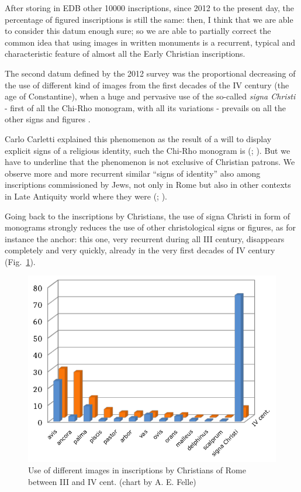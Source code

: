 \documentclass[amsthm,ebook]{saparticle}
\begin{document}
After storing in EDB other 10000 inscriptions, since 2012 to the present day, the percentage of figured inscriptions is
still the same: then, I think that we are able to consider this datum enough sure; so we are able to partially correct
the common idea that using images in written monuments is a recurrent, typical and characteristic feature of almost all
the Early Christian inscriptions.

The second datum defined by the 2012 survey was the proportional decreasing of the use of different kind of images from
the first decades of the IV century (the age of Constantine), when a huge and pervasive use of the so-called \emph{signa
Christi} - first of all the Chi-Rho monogram, with all its variations - prevails on all the other signs and figures
\citep[101-102]{felle_apporto_2013}.

Carlo Carletti explained this phenomenon as the result of a will to display explicit signs of a religious identity, such
the Chi-Rho monogram is (\citealp[68-72]{carletti_epigrafia_2008}; \citealp[365-366]{felle_judaism_2007}). But we have to underline that the phenomenon is
not exclusive of Christian patrons. We observe more and more recurrent similar ``signs of
identity'' also among inscriptions commissioned by Jews, not only in Rome but also in other contexts in
Late Antiquity world where they were (\citealp[passim]{felle_judaism_2007}; \citealp{pesce_documenti_2016}).

Going back to the inscriptions by Christians, the use of signa Christi in form of monograms strongly reduces the use
of other christological signs or figures, as for instance the anchor: this one, very recurrent during all III
century, disappears completely and very quickly, already in the very first decades of IV century \citep[103]{felle_apporto_2013}
(Fig.~\ref{fig:2}). %




\begin{figure}[!bp]
\centering
 \includegraphics[width=\columnwidth]{FelleVisualFeaturesofinscriptionsEAGLE2016FullPaper-img001.pdf}
\caption{Use of different images in inscriptions by Christians of Rome between III and IV cent. (chart by A. E. Felle)}
\label{fig:2}
\end{figure}
 
\end{document}
